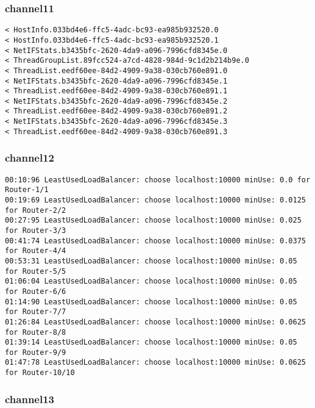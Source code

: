 \subsubsection*{channel11}

\begin{lstlisting}[language=config]
< HostInfo.033bd4e6-ffc5-4adc-bc93-ea985b932520.0
< HostInfo.033bd4e6-ffc5-4adc-bc93-ea985b932520.1
< NetIFStats.b3435bfc-2620-4da9-a096-7996cfd8345e.0
< ThreadGroupList.89fcc524-a7cd-4828-984d-9c1d2b214b9e.0
< ThreadList.eedf60ee-84d2-4909-9a38-030cb760e891.0
< NetIFStats.b3435bfc-2620-4da9-a096-7996cfd8345e.1
< ThreadList.eedf60ee-84d2-4909-9a38-030cb760e891.1
< NetIFStats.b3435bfc-2620-4da9-a096-7996cfd8345e.2
< ThreadList.eedf60ee-84d2-4909-9a38-030cb760e891.2
< NetIFStats.b3435bfc-2620-4da9-a096-7996cfd8345e.3
< ThreadList.eedf60ee-84d2-4909-9a38-030cb760e891.3
\end{lstlisting}

\subsubsection*{channel12}

\begin{lstlisting}[language=config]
00:10:96 LeastUsedLoadBalancer: choose localhost:10000 minUse: 0.0 for Router-1/1
00:19:69 LeastUsedLoadBalancer: choose localhost:10000 minUse: 0.0125 for Router-2/2
00:27:95 LeastUsedLoadBalancer: choose localhost:10000 minUse: 0.025 for Router-3/3
00:41:74 LeastUsedLoadBalancer: choose localhost:10000 minUse: 0.0375 for Router-4/4
00:53:31 LeastUsedLoadBalancer: choose localhost:10000 minUse: 0.05 for Router-5/5
01:06:04 LeastUsedLoadBalancer: choose localhost:10000 minUse: 0.05 for Router-6/6
01:14:90 LeastUsedLoadBalancer: choose localhost:10000 minUse: 0.05 for Router-7/7
01:26:84 LeastUsedLoadBalancer: choose localhost:10000 minUse: 0.0625 for Router-8/8
01:39:14 LeastUsedLoadBalancer: choose localhost:10000 minUse: 0.05 for Router-9/9
01:47:78 LeastUsedLoadBalancer: choose localhost:10000 minUse: 0.0625 for Router-10/10
\end{lstlisting}

\subsubsection*{channel13}

